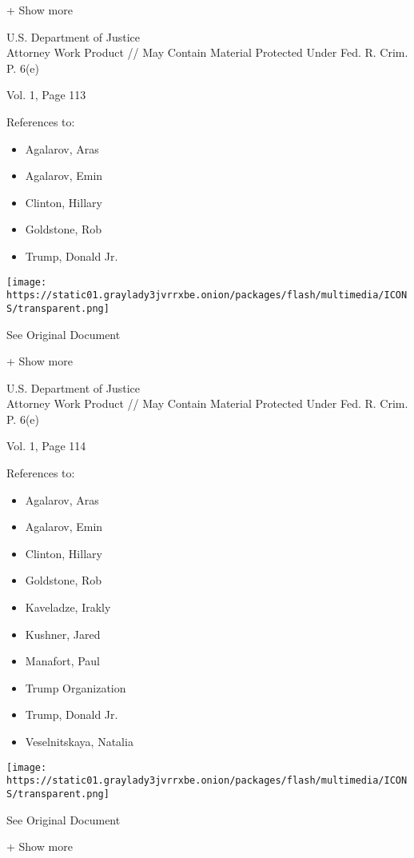 + Show more

U.S. Department of Justice\\
Attorney Work Product // May Contain Material Protected Under Fed. R.
Crim. P. 6(e)

Vol. 1, Page 113

References to:

\begin{itemize}
\tightlist
\item
  Agalarov, Aras
\item
  Agalarov, Emin
\item
  Clinton, Hillary
\item
  Goldstone, Rob
\item
  Trump, Donald Jr.
\end{itemize}

\protect\hyperlink{}{}

\texttt{[image: https://static01.graylady3jvrrxbe.onion/packages/flash/multimedia/ICONS/transparent.png]}

See Original Document

+ Show more

U.S. Department of Justice\\
Attorney Work Product // May Contain Material Protected Under Fed. R.
Crim. P. 6(e)

Vol. 1, Page 114

References to:

\begin{itemize}
\tightlist
\item
  Agalarov, Aras
\item
  Agalarov, Emin
\item
  Clinton, Hillary
\item
  Goldstone, Rob
\item
  Kaveladze, Irakly
\item
  Kushner, Jared
\item
  Manafort, Paul 
\item
  Trump Organization
\item
  Trump, Donald Jr.
\item
  Veselnitskaya, Natalia
\end{itemize}

\protect\hyperlink{}{}

\texttt{[image: https://static01.graylady3jvrrxbe.onion/packages/flash/multimedia/ICONS/transparent.png]}

See Original Document

+ Show more

